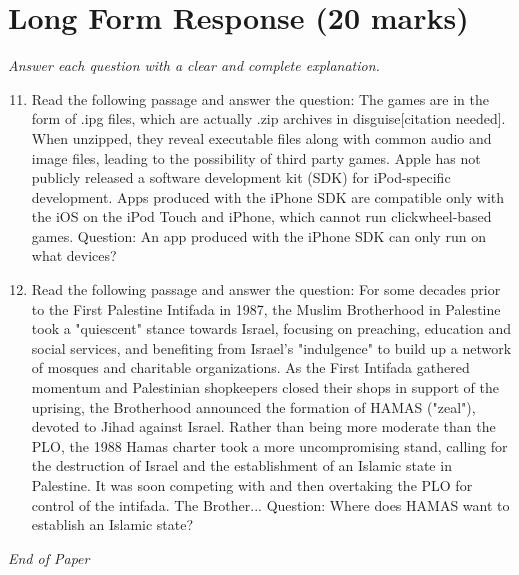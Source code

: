 \documentclass[12pt]{article}
\begin{document}
\section*{Long Form Response (20 marks)}
\textit{Answer each question with a clear and complete explanation.}
\begin{enumerate}[label=\arabic*.]
\setcounter{enumi}{10}
\item Read the following passage and answer the question: The games are in the form of .ipg files, which are actually .zip archives in disguise[citation needed]. When unzipped, they reveal executable files along with common audio and image files, leading to the possibility of third party games. Apple has not publicly released a software development kit (SDK) for iPod-specific development. Apps produced with the iPhone SDK are compatible only with the iOS on the iPod Touch and iPhone, which cannot run clickwheel-based games. Question: An app produced with the iPhone SDK can only run on what devices?
\item Read the following passage and answer the question: For some decades prior to the First Palestine Intifada in 1987, the Muslim Brotherhood in Palestine took a "quiescent" stance towards Israel, focusing on preaching, education and social services, and benefiting from Israel's "indulgence" to build up a network of mosques and charitable organizations. As the First Intifada gathered momentum and Palestinian shopkeepers closed their shops in support of the uprising, the Brotherhood announced the formation of HAMAS ("zeal"), devoted to Jihad against Israel. Rather than being more moderate than the PLO, the 1988 Hamas charter took a more uncompromising stand, calling for the destruction of Israel and the establishment of an Islamic state in Palestine. It was soon competing with and then overtaking the PLO for control of the intifada. The Brother... Question: Where does HAMAS want to establish an Islamic state?
\end{enumerate}

\vfill
\noindent\textit{End of Paper}
\end{document}
